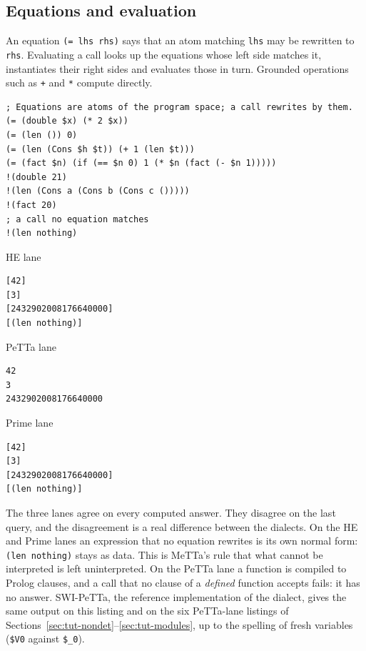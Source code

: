 \documentclass[11pt]{article}
\newcommand{\code}[1]{\texttt{#1}}
\newcommand{\outhead}[1]{{\footnotesize\sffamily #1}\par\vspace{1pt}}
\newcommand{\PeTTa}{\textup{PeTTa}}
\newcommand{\HE}{\textup{HE}}
\begin{document}
\subsection{Equations and evaluation}
\label{sec:tut-equations}

An equation \code{(= lhs rhs)} says that an atom matching \code{lhs} may be
rewritten to \code{rhs}.  Evaluating a call looks up the equations whose
left side matches it, instantiates their right sides and evaluates those in
turn.  Grounded operations such as \code{+} and \code{*} compute directly.

\begin{lstlisting}[style=metta,caption={Equations and evaluation; all three lanes},label={lst:t01}]
; Equations are atoms of the program space; a call rewrites by them.
(= (double $x) (* 2 $x))
(= (len ()) 0)
(= (len (Cons $h $t)) (+ 1 (len $t)))
(= (fact $n) (if (== $n 0) 1 (* $n (fact (- $n 1)))))
!(double 21)
!(len (Cons a (Cons b (Cons c ()))))
!(fact 20)
; a call no equation matches
!(len nothing)
\end{lstlisting}
\noindent\begin{minipage}[t]{0.32\textwidth}
\outhead{HE lane}
\begin{lstlisting}[style=out]
[42]
[3]
[2432902008176640000]
[(len nothing)]
\end{lstlisting}
\end{minipage}\hfill
\begin{minipage}[t]{0.32\textwidth}
\outhead{PeTTa lane}
\begin{lstlisting}[style=out]
42
3
2432902008176640000
\end{lstlisting}
\end{minipage}\hfill
\begin{minipage}[t]{0.32\textwidth}
\outhead{Prime lane}
\begin{lstlisting}[style=out]
[42]
[3]
[2432902008176640000]
[(len nothing)]
\end{lstlisting}
\end{minipage}

\noindent
The three lanes agree on every computed answer.  They disagree on the last
query, and the disagreement is a real difference between the dialects.  On the
\HE{} and Prime lanes an expression that no equation rewrites is its own
normal form: \code{(len nothing)} stays as data.  This is MeTTa's rule that
what cannot be interpreted is left uninterpreted.  On the \PeTTa{} lane a
function is compiled to Prolog clauses, and a call that no clause of a
\emph{defined} function accepts fails: it has no answer.  SWI-\PeTTa{}, the
reference implementation of the dialect, gives the same output on this
listing and on the six \PeTTa{}-lane listings of
Sections~\ref{sec:tut-nondet}--\ref{sec:tut-modules}, up to the spelling of
fresh variables (\code{\$V0} against \code{\$\_0}).
\end{document}
